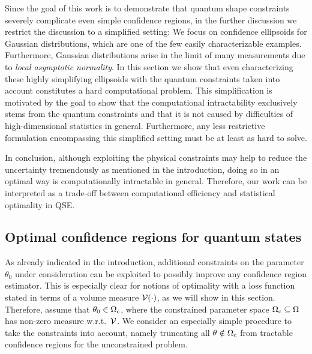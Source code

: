 Since the goal of this work is to demonstrate that quantum shape constraints severely complicate even  simple confidence regions, in the further discussion we restrict the discussion to a simplified setting:
We focus on confidence ellipsoids for Gaussian distributions, which are one of the few easily characterizable examples.
Furthermore, Gaussian distributions arise in the limit of many measurements due to \emph{local asymptotic normality}.
In this section we show that even characterizing these highly simplifying ellipsoids with the quantum constraints taken into account constitutes a hard computational problem.
This simplification is motivated by the goal to show that the computational intractability exclusively stems from the quantum constraints and that it is not caused by difficulties of high-dimensional statistics in general.
Furthermore, any less restrictive formulation encompassing this simplified setting must be at least as hard to solve.

In conclusion, although exploiting the physical constraints may help to reduce the uncertainty tremendously as mentioned in the introduction, doing so in an optimal way is computationally intractable in general.
Therefore, our work can be interpreted as a trade-off between computational efficiency and statistical optimality in QSE.

\subsection{Optimal confidence regions for quantum states}
\label{sub:ortho.optimal}

As already indicated in the introduction, additional constraints on the parameter $\theta_0$ under consideration can be exploited to possibly improve any confidence region estimator.
This is especially clear for notions of optimality with a loss function stated in terms of a volume measure $\mathcal{V}(\cdot)$, as we will show in this section.
Therefore, assume that $\theta_0 \in \Omega_{\mathrm{c}}$, where the constrained parameter space $\Omega_{\mathrm{c}} \subseteq \Omega$ has non-zero measure w.r.t.\ $\mathcal{V}$.
We consider an especially simple procedure to take the constraints into account, namely truncating all $\theta \notin \Omega_{\mathrm{c}}$ from tractable confidence regions for the unconstrained problem.

